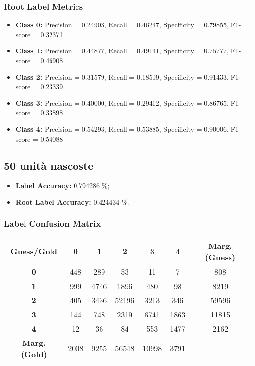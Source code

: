 \subsubsection{Root Label Metrics}
\begin{itemize}
	\item \textbf{Class 0:} Precision = 0.24903, Recall = 0.46237, Specificity = 0.79855, F1-score = 0.32371
	\item \textbf{Class 1:} Precision = 0.44877, Recall = 0.49131, Specificity = 0.75777, F1-score = 0.46908
	\item \textbf{Class 2:} Precision = 0.31579, Recall = 0.18509, Specificity = 0.91433, F1-score = 0.23339
	\item \textbf{Class 3:} Precision = 0.40000, Recall = 0.29412, Specificity = 0.86765, F1-score = 0.33898
	\item \textbf{Class 4:} Precision = 0.54293, Recall = 0.53885, Specificity = 0.90006, F1-score = 0.54088
\end{itemize}

\subsection{50 unità nascoste}

\begin{itemize}
	\item \textbf{Label Accuracy:} 0.794286 \%;
	\item \textbf{Root Label Accuracy:} 0.424434 \%;
\end{itemize}

\subsubsection{Label Confusion Matrix}
\begin{table}[h]
	\centering
	\begin{tabular}{c|ccccc|c}
		\textbf{Guess/Gold}   & \textbf{0} & \textbf{1} & \textbf{2} & \textbf{3} & \textbf{4} & \textbf{Marg. (Guess)} \\
		\hline
		\textbf{0}            & 448        & 289        & 53         & 11         & 7          & 808                    \\
		\textbf{1}            & 999        & 4746       & 1896       & 480        & 98         & 8219                   \\
		\textbf{2}            & 405        & 3436       & 52196      & 3213       & 346        & 59596                  \\
		\textbf{3}            & 144        & 748        & 2319       & 6741       & 1863       & 11815                  \\
		\textbf{4}            & 12         & 36         & 84         & 553        & 1477       & 2162                   \\
		\hline
		\textbf{Marg. (Gold)} & 2008       & 9255       & 56548      & 10998      & 3791       &                        \\
	\end{tabular}
\end{table}

